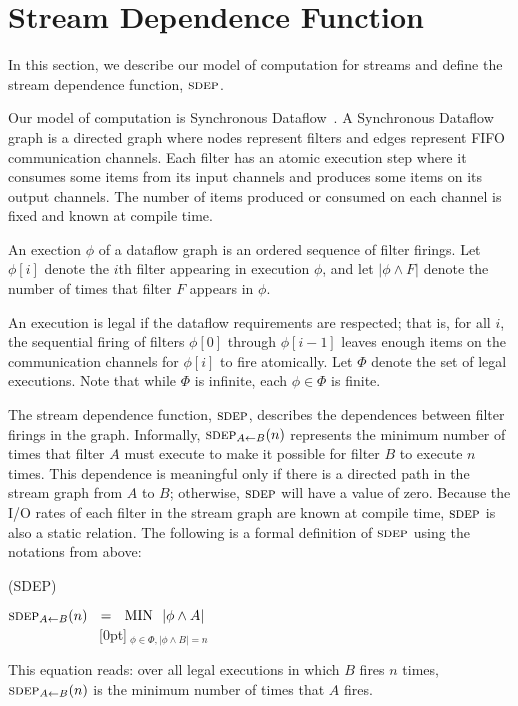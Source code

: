 \section{Stream Dependence Function}

In this section, we describe our model of computation for streams and
define the stream dependence function, $\textsc{sdep}$.

Our model of computation is Synchronous Dataflow~\cite{LM87-i}.  A
Synchronous Dataflow graph is a directed graph where nodes represent
filters and edges represent FIFO communication channels.  Each filter
has an atomic execution step where it consumes some items from its
input channels and produces some items on its output channels.  The
number of items produced or consumed on each channel is fixed and
known at compile time.

An exection $\phi$ of a dataflow graph is an ordered sequence of
filter firings.  Let $\phi[i]$ denote the $i$th filter appearing in
execution $\phi$, and let $|\phi \wedge F|$ denote the number of times
that filter $F$ appears in $\phi$.

An execution is legal if the dataflow requirements are respected; that
is, for all $i$, the sequential firing of filters $\phi[0]$ through
$\phi[i-1]$ leaves enough items on the communication channels for
$\phi[i]$ to fire atomically.  Let $\Phi$ denote the set of legal
executions.  Note that while $\Phi$ is infinite, each $\phi \in \Phi$
is finite.

The stream dependence function, $\textsc{sdep}$, describes the dependences
between filter firings in the graph.  Informally, $\sdepf{A}{B}(n)$
represents the minimum number of times that filter $A$ must execute to
make it possible for filter $B$ to execute $n$ times.  This dependence
is meaningful only if there is a directed path in the stream graph
from $A$ to $B$; otherwise, $\textsc{sdep}$ will have a value of zero.
Because the I/O rates of each filter in the stream graph are known at
compile time, $\textsc{sdep}$ is also a static relation.  The following is a
formal definition of $\textsc{sdep}$ using the notations from above:
\begin{definition}(SDEP)
\begin{center}
$\sdepf{A}{B}(n)~~ = ~~\mbox{MIN}~~|\phi \wedge A|$ \\
~~~~~~~~~~~~~\raisebox{5pt}[0pt]{$~_{\phi \in \Phi, |\phi \wedge B| = n}$}
\end{center}
\end{definition}
This equation reads: over all legal executions in which $B$ fires $n$
times, $\sdepf{A}{B}(n)$ is the minimum number of times that $A$ fires.

